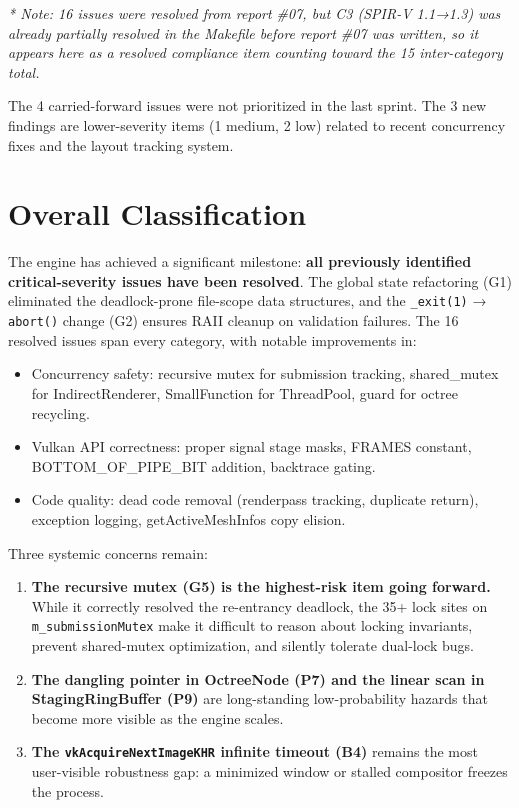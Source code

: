 \documentclass[a4paper,12pt]{article}
\begin{document}
\textit{* Note: 16 issues were resolved from report \#07, but C3 (SPIR-V 1.1→1.3)
was already partially resolved in the Makefile before report \#07 was written,
so it appears here as a resolved compliance item counting toward the 15
inter-category total.}

The 4 carried-forward issues were not prioritized in the last sprint. The 3 new
findings are lower-severity items (1 medium, 2 low) related to recent
concurrency fixes and the layout tracking system.

\newpage

\section{Overall Classification}

The engine has achieved a significant milestone: \textbf{all previously identified
critical-severity issues have been resolved}. The global state refactoring (G1)
eliminated the deadlock-prone file-scope data structures, and the
\texttt{\_exit(1)} → \texttt{abort()} change (G2) ensures RAII cleanup on
validation failures. The 16 resolved issues span every category, with notable
improvements in:

\begin{itemize}[noitemsep]
  \item Concurrency safety: recursive mutex for submission tracking, shared\_mutex
        for IndirectRenderer, SmallFunction for ThreadPool, guard for octree
        recycling.
  \item Vulkan API correctness: proper signal stage masks, FRAMES constant,
        BOTTOM\_OF\_PIPE\_BIT addition, backtrace gating.
  \item Code quality: dead code removal (renderpass tracking, duplicate return),
        exception logging, getActiveMeshInfos copy elision.
\end{itemize}

Three systemic concerns remain:

\begin{enumerate}
  \item \textbf{The recursive mutex (G5) is the highest-risk item going forward.}
        While it correctly resolved the re-entrancy deadlock, the 35+ lock sites
        on \texttt{m\_submissionMutex} make it difficult to reason about locking
        invariants, prevent shared-mutex optimization, and silently tolerate
        dual-lock bugs.
  \item \textbf{The dangling pointer in OctreeNode (P7) and the linear scan in
        StagingRingBuffer (P9)} are long-standing low-probability hazards that
        become more visible as the engine scales.
  \item \textbf{The \texttt{vkAcquireNextImageKHR} infinite timeout (B4)} remains
        the most user-visible robustness gap: a minimized window or stalled
        compositor freezes the process.
\end{enumerate}
\end{document}

